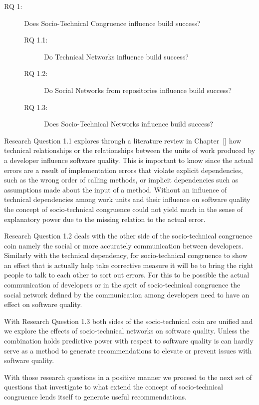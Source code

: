\begin{description}
% 
\item[RQ 1:] Does Socio-Technical Congruence influence build success?
  \begin{description}
  \item[RQ 1.1:] Do Technical Networks influence build success?
  \item[RQ 1.2:] Do Social Networks from repositories influence build success?
  \item[RQ 1.3:] Does Socio-Technical Networks influence build success?
  \end{description}
%
\end{description}
Research Question 1.1 explores through a literature review in Chapter~\ref{} how technical relationships or the relationships between the units of work produced by a developer influence software quality.
This is important to know since the actual errors are a result of implementation errors that violate explicit dependencies, such as the wrong order of calling methods, or implicit dependencies such as assumptions made about the input of a method. 
Without an influence of technical dependencies among work units and their influence on software quality the concept of socio-technical congruence could not yield much in the sense of explanatory power due to the missing relation to the actual error.

Research Question 1.2 deals with the other side of the socio-technical congruence coin namely the social or more accurately communication between developers.
Similarly with the technical dependency, for socio-technical congruence to show an effect that is actually help take corrective measure it will be to bring the right people to talk to each other to sort out errors. 
For this to be possible the actual communication of developers or in the sprit of socio-technical congruence the social network defined by the communication among developers need to have an effect on software quality.

With Research Question 1.3 both sides of the socio-technical coin are unified and we explore the effects of socio-technical networks on software quality.
Unless the combination holds predictive power with respect to software quality is can hardly serve as a method to generate recommendations to elevate or prevent issues with software quality.

With those research questions in a positive manner we proceed to the next set of questions that investigate to what extend the concept of socio-technical congruence lends itself to generate useful recommendations.

